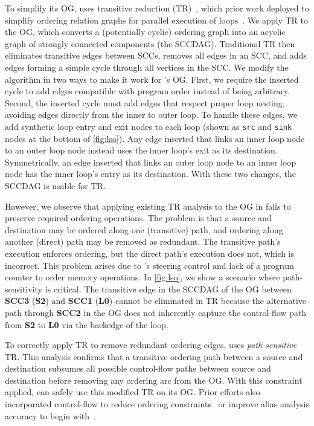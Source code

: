 \figRipTideArch

To simplify its OG, \riptidecomp uses transitive reduction (TR)~\cite{aho-tr}, which prior work
deployed to simplify ordering relation graphs for parallel
execution of loops~\cite{midkiff-padua,compiler-sync}.
%
We apply TR to the OG, which converts a (potentially cyclic) ordering 
graph into an acyclic graph of strongly connected components (the SCCDAG). 
%
Traditional TR then eliminates transitive edges between SCCs, removes 
all edges in an SCC, and adds edges forming a simple cycle through all 
vertices in the SCC.
%
We modify the algorithm in two ways to make it work for \riptide's OG.
First, we require the inserted cycle to add edges compatible with program order
instead of being arbitrary.  Second, the inserted cycle must add edges that
respect proper loop nesting, avoiding edges directly from the inner to outer
loop.  To handle these edges, we add synthetic loop entry and exit nodes to
each loop (shown as \texttt{src} and \texttt{sink} nodes at the bottom 
of \autoref{fig:lso}). Any edge inserted %
that links an inner loop node to an outer loop node instead uses the inner 
loop's exit as its destination.
Symmetrically, an edge inserted that links an outer loop node to an inner loop
node has the inner loop's entry as its destination.   With these two changes,
the SCCDAG is usable for TR.
%

However, we observe that applying existing TR analysis to the OG in \riptide fails to
preserve required ordering operations.
%
The problem is that a source and destination may be ordered along one
(transitive) path, and ordering along another (direct) path may be removed as
redundant.  The transitive path's execution enforces ordering, but the direct
path's execution does not, which is incorrect.
%
This problem arises due to \riptide's steering control and lack of a program
counter to order memory operations.
%
In \autoref{fig:lso}, we show a scenario where path-sensitivity is critical.
%
The transitive edge in the SCCDAG of the OG between \textbf{SCC3} 
(\textbf{S2}) and \textbf{SCC1} (\textbf{L0}) cannot be eliminated 
in TR because the alternative path through \textbf{SCC2} 
in the OG does not inherently capture the control-flow path from \textbf{S2} to
\textbf{L0} via the backedge of the loop.

To correctly apply TR to remove redundant ordering edges, \riptidecomp uses
\emph{path-sensitive} TR. 
%
This analysis confirms that a transitive ordering path between a source and
destination subsumes all possible control-flow paths between source and
destination before removing any ordering arc from the OG.
%
With this constraint applied,
\riptide can safely use this modified TR on its OG.
%
Prior efforts also incorporated control-flow to reduce ordering constraints~\cite{midkiff-padua,doacross} 
or improve alias analysis accuracy to begin with~\cite{hind-aa}.


